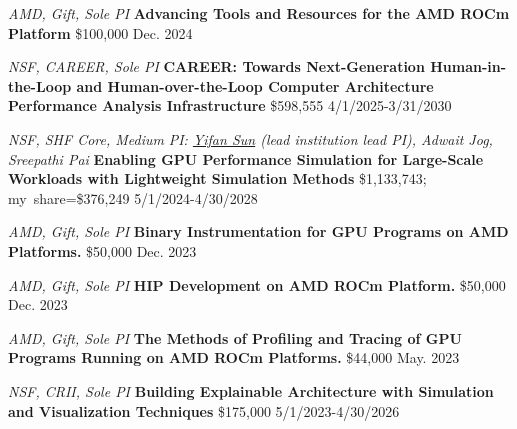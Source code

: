 


\begin{cventries}

  \vspace{0.1cm}

\cvgrantentry
    {\textit{AMD, Gift, Sole PI}}
    {\textbf{Advancing Tools and Resources for the AMD ROCm Platform}}
    {\$100,000}
    {Dec. 2024}
    {}
    \vspace{-0.5cm}

\cvgrantentry
    {\textit{NSF, CAREER, Sole PI}}
    {\textbf{CAREER: Towards Next-Generation Human-in-the-Loop and Human-over-the-Loop Computer Architecture Performance Analysis Infrastructure}}
    {\$598,555}
    {4/1/2025-3/31/2030}
    {}
    \vspace{-0.5cm}


  \cvgrantentry
    {\textit{NSF, SHF Core, Medium}
    \linebreak
    \textit{PI: \underline{Yifan Sun} (lead institution lead PI), Adwait Jog, Sreepathi Pai}}
    {\textbf{Enabling GPU Performance Simulation for Large-Scale Workloads with Lightweight Simulation Methods}}
    {\$1,133,743; my~share=\$376,249}
    {5/1/2024-4/30/2028}
    {}
    \vspace{-0.5cm}


  \cvgrantentry
    {\textit{AMD, Gift, Sole PI}}
    {\textbf{Binary Instrumentation for GPU Programs on AMD Platforms.}}
    {\$50,000}
    {Dec. 2023}
    {}
    \vspace{-0.5cm}

  \cvgrantentry
    {\textit{AMD, Gift, Sole PI}}
    {\textbf{HIP Development on AMD ROCm Platform.}}
    {\$50,000}
    {Dec. 2023}
    {}
    \vspace{-0.5cm}

  \cvgrantentry
    {\textit{AMD, Gift, Sole PI}}
    {\textbf{The Methods of Profiling and Tracing of GPU Programs Running on AMD ROCm Platforms.}}
    {\$44,000}
    {May. 2023}
    {}
    \vspace{-0.5cm}


  \cvgrantentry
    {\textit{NSF, CRII, Sole PI}}
    {\textbf{Building Explainable Architecture with Simulation and Visualization Techniques}}
    {\$175,000}
    {5/1/2023-4/30/2026}
    {}
    \vspace{-0.5cm}




\end{cventries}
